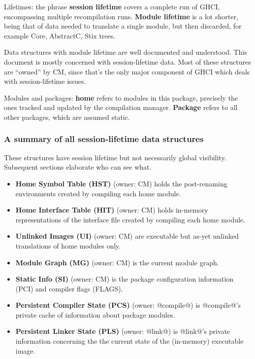 \documentclass[11pt]{article}
\begin{document}
Lifetimes: the phrase {\bf session lifetime} covers a complete run of
GHCI, encompassing multiple recompilation runs.  {\bf Module lifetime}
is a lot shorter, being that of data needed to translate a single
module, but then discarded, for example Core, AbstractC, Stix trees.

Data structures with module lifetime are well documented and understood.
This document is mostly concerned with session-lifetime data.
Most of these structures are ``owned'' by CM, since that's
the only major component of GHCI which deals with session-lifetime
issues. 

Modules and packages: {\bf home} refers to modules in this package,
precisely the ones tracked and updated by the compilation manager.
{\bf Package} refers to all other packages, which are assumed static.

\subsubsection*{A summary of all session-lifetime data structures}

These structures have session lifetime but not necessarily global
visibility.  Subsequent sections elaborate who can see what.
\begin{itemize}
\item {\bf Home Symbol Table (HST)} (owner: CM) holds the post-renaming
      environments created by compiling each home module.
\item {\bf Home Interface Table (HIT)} (owner: CM) holds in-memory
      representations of the interface file created by compiling 
      each home module.
\item {\bf Unlinked Images (UI)} (owner: CM) are executable but as-yet
      unlinked translations of home modules only.
\item {\bf Module Graph (MG)} (owner: CM) is the current module graph.
\item {\bf Static Info (SI)} (owner: CM) is the package configuration
      information (PCI) and compiler flags (FLAGS).
\item {\bf Persistent Compiler State (PCS)} (owner: @compile@)
      is @compile@'s private cache of information about package
      modules.
\item {\bf Persistent Linker State (PLS)} (owner: @link@) is
      @link@'s private information concerning the the current 
      state of the (in-memory) executable image.
\end{itemize}
\end{document}
